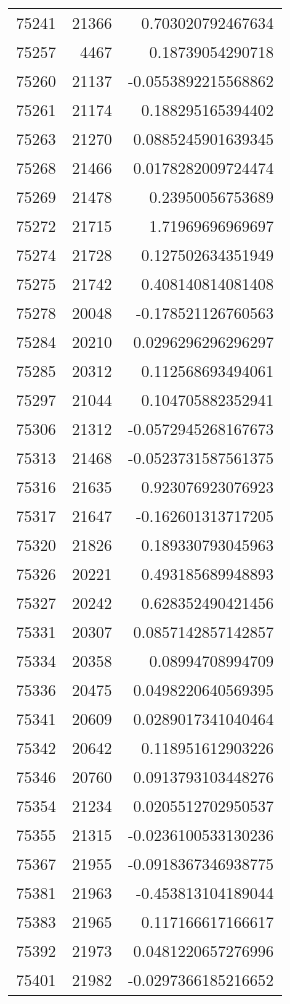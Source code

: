 \begin{tabular}{r | r | r}
75241 & 21366 & 0.703020792467634 \\
75257 & 4467 & 0.18739054290718 \\
75260 & 21137 & -0.0553892215568862 \\
75261 & 21174 & 0.188295165394402 \\
75263 & 21270 & 0.0885245901639345 \\
75268 & 21466 & 0.0178282009724474 \\
75269 & 21478 & 0.23950056753689 \\
75272 & 21715 & 1.71969696969697 \\
75274 & 21728 & 0.127502634351949 \\
75275 & 21742 & 0.408140814081408 \\
75278 & 20048 & -0.178521126760563 \\
75284 & 20210 & 0.0296296296296297 \\
75285 & 20312 & 0.112568693494061 \\
75297 & 21044 & 0.104705882352941 \\
75306 & 21312 & -0.0572945268167673 \\
75313 & 21468 & -0.0523731587561375 \\
75316 & 21635 & 0.923076923076923 \\
75317 & 21647 & -0.162601313717205 \\
75320 & 21826 & 0.189330793045963 \\
75326 & 20221 & 0.493185689948893 \\
75327 & 20242 & 0.628352490421456 \\
75331 & 20307 & 0.0857142857142857 \\
75334 & 20358 & 0.08994708994709 \\
75336 & 20475 & 0.0498220640569395 \\
75341 & 20609 & 0.0289017341040464 \\
75342 & 20642 & 0.118951612903226 \\
75346 & 20760 & 0.0913793103448276 \\
75354 & 21234 & 0.0205512702950537 \\
75355 & 21315 & -0.0236100533130236 \\
75367 & 21955 & -0.0918367346938775 \\
75381 & 21963 & -0.453813104189044 \\
75383 & 21965 & 0.117166617166617 \\
75392 & 21973 & 0.0481220657276996 \\
75401 & 21982 & -0.0297366185216652 \\

\end{tabular}
